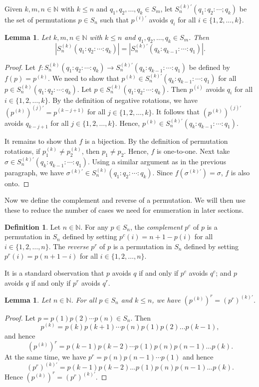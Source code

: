 \documentclass[11pt]{article}
\newtheorem{lemma}[theorem]{Lemma}
\theoremstyle{definition}
\newtheorem{definition}[theorem]{Definition}
\numberwithin{equation}{section}
\begin{document}
Given $k,m,n\in\mathbb{N}$ with $k\leq n$ and $q_1,q_2,\ldots,q_k\in S_m$, let $S_n^{(k)'}(q_1:q_2:\cdots;q_k)$ be the set of permutations $p\in S_n$ such that $p^{(i)'}$ avoids $q_i$ for all $i\in\{1,2,\ldots,k\}$.
\begin{lemma}\label{Lemma:ClockCounterclock}
Let $k,m,n\in\mathbb{N}$ with $k\leq n$ and $q_1,q_2,\ldots,q_k\in S_m$. Then 
\[
|S_n^{(k)}(q_1:q_2:\cdots:q_k)|=|S_n^{(k)'}(q_k:q_{k-1}: \cdots:q_1)|.
\]
\end{lemma}
\begin{proof}
Let $f:S_n^{(k)}(q_1:q_2:\cdots:q_k)\to S_n^{(k)'}(q_k:q_{k-1}:\cdots:q_1)$ be defined by $f(p)=p^{(k)}$. We need to show that $p^{(k)}\in S_n^{(k)'}(q_k:q_{k-1}:\cdots:q_1)$ for all $p\in S_n^{(k)}(q_1:q_2:\cdots:q_k)$. Let $p\in S_n^{(k)}(q_1:q_2:\cdots:q_k)$. Then $p^{(i)}$ avoids $q_i$ for all $i\in\{1,2,\ldots,k\}$. By the definition of negative rotations, we have $(p^{(k)})^{(j)'}=p^{(k-j+1)}$ for all $j\in\{1,2,\ldots,k\}$. It follows that $(p^{(k)})^{(j)'}$ avoids $q_{k-j+1}$ for all $j\in\{1,2,\ldots,k\}$. Hence, $p^{(k)}\in S_n^{(k)'}(q_k:q_{k-1}:\cdots:q_1)$.

It remains to show that $f$ is a bijection. By the definition of permutation rotations, if $p_1^{(k)}\neq p_2^{(k)}$, then $p_1\neq p_2$. Hence, $f$ is one-to-one. Next take $\sigma\in S_n^{(k)'}(q_k:q_{k-1}:\cdots:q_1)$. 
Using a similar argument as in the previous paragraph, we have $\sigma^{(k)'}\in S_n^{(k)}(q_1:q_2:\cdots:q_k)$. Since $f(\sigma^{(k)'})=\sigma$, $f$ is also onto.
\end{proof}
Now we define the complement and reverse of a permutation. We will then use these to reduce the number of cases we need for enumeration in later sections.

\begin{definition}\label{Definition:Complements}
Let $n\in\mathbb{N}$. For any $p\in S_n$, the {\em complement} $p^c$ of $p$ is a permutation in $S_n$ defined by setting 
$p^c(i)=n+1-p(i)$ for all $i\in\{1,2,\ldots,n\}$. The {\em reverse} $p^r$ of $p$ is a permutation in $S_n$ defined by setting $p^r(i)=p(n+1-i)$ for all $i\in\{1,2,\ldots,n\}$. 
\end{definition}

It is a standard observation that $p$ avoids $q$ if and only if $p^c$ avoids $q^c$; and $p$ avoids $q$ if and only if $p^r$ avoids $q^r$.

\begin{lemma}\label{Lemma:DirectionInverse}
Let $n\in\mathbb{N}$. For all $p\in S_n$ and $k\leq n$, we have $(p^{(k)})^r=(p^r)^{(k)'}$.
\end{lemma}
\begin{proof}
    Let $p=p(1)p(2)\cdots p(n)\in S_n$. Then
    \[
    p^{(k)}=p(k)p(k+1)\cdots p(n)p(1)p(2)\ldots p(k-1),
    \]
    and hence
    \[
    (p^{(k)})^r=p(k-1)p(k-2)\cdots p(1)p(n)p(n-1)\ldots p(k).
    \]
At the same time, we have $p^r=p(n)p(n-1)\cdots p(1)$ and hence
\[
(p^r)^{(k)'}=p(k-1)p(k-2)\ldots p(1)p(n)p(n-1)\ldots p(k).
\]
Hence $(p^{(k)})^r=(p^r)^{(k)'}$.
\end{proof}
\end{document}
